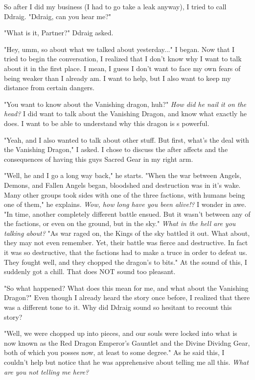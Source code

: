 \documentclass{article}
\begin{document}
So after I did my business (I had to go take a leak anyway), I tried to call Ddraig. "Ddraig, can you hear me?"

"What is it, Partner?" Ddraig asked.

"Hey, umm, so about what we talked about yesterday..." I began. Now that I tried to begin the conversation, I realized that I don't know why I want to talk about it in the first place. I mean, I guess I don't want to face my own fears of being weaker than I already am. I want to help, but I also want to keep my distance from certain dangers.

"You want to know about the Vanishing dragon, huh?" \emph{How did he nail it on the head?} I did want to talk about the Vanishing Dragon, and know what exactly he does. I want to be able to understand why this dragon is s powerful.

"Yeah, and I also wanted to talk about other stuff. But first, what's the deal with the Vanishing Dragon," I asked. I chose to discuss the after affects and the consequences of having this guys Sacred Gear in my right arm.

"Well, he and I go a long way back," he starts. "When the war between Angels, Demons, and Fallen Angels began, bloodshed and destruction was in it's wake. Many other groups took sides with one of the three factions, with humans being one of them," he explains. \emph{Wow, how long have you been alive!?} I wonder in awe. "In time, another completely different battle ensued. But it wasn't between any of the factions, or even on the ground, but in the sky." \emph{What in the hell are you talking about?} "As war raged on, the Kings of the sky battled it out. What about, they may not even remember. Yet, their battle was fierce and destructive. In fact it was so destructive, that the factions had to make a truce in order to defeat us. They fought well, and they chopped the dragon's to bits." At the sound of this, I suddenly got a chill. That does NOT sound too pleasant.

"So what happened? What does this mean for me, and what about the Vanishing Dragon?" Even though I already heard the story once before, I realized that there was a different tone to it. Why did Ddraig sound so hesitant to recount this story?

"Well, we were chopped up into pieces, and our souls were locked into what is now known as the Red Dragon Emperor's Gauntlet and the Divine Dividng Gear, both of which you posses now, at least to some degree." As he said this, I couldn't help but notice that he was apprehensive about telling me all this. \emph{What are you not telling me here?}
\end{document}
